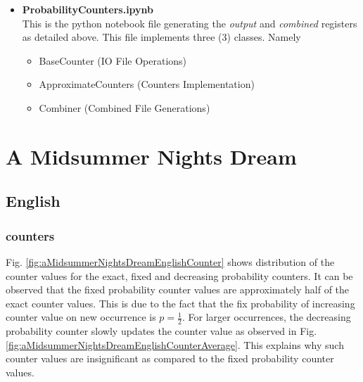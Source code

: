 \documentclass[longpaper, english, final, times]{revdetua}
\begin{document}
\begin{itemize}
			\item \textbf{ProbabilityCounters.ipynb} \\
				This is the python notebook file generating the \textit{output} and \textit{combined} registers as detailed above. This file implements three (3) classes. Namely
				\begin{itemize}
					\setlength\itemsep{0em}
					\item BaseCounter (IO File Operations)
					\item ApproximateCounters (Counters Implementation)
					\item Combiner (Combined File Generations)
				\end{itemize}
		\end{itemize}
	
	\section{A Midsummer Nights Dream}
		\subsection{English}
			\subsubsection{counters}
				Fig. \ref{fig:aMidsummerNightsDreamEnglishCounter} shows distribution of the counter values for the exact, fixed and decreasing probability counters. It can be observed that the fixed probability counter values are approximately half of the exact counter values. This is due to the fact that the fix probability of increasing counter value on new occurrence is $p=\frac{1}{2}$.  For larger occurrences, the decreasing probability counter slowly updates the counter value as observed in Fig. \ref{fig:aMidsummerNightsDreamEnglishCounterAverage}. This explains why such counter values are insignificant as compared to the fixed probability counter values.\\
				
\end{document}
